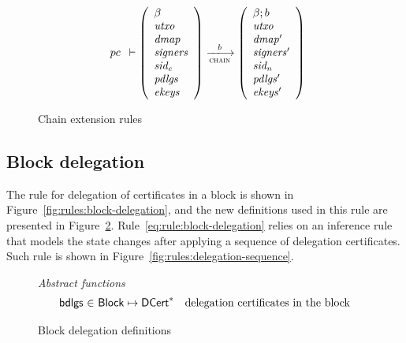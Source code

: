 \begin{figure}
\begin{equation}
{{\begin{array}{l}
         pc
      \end{array}}
      \vdash
      {
        \left(
          \begin{array}{l}
            \beta\\
            \var{utxo}\\
            \var{dmap}\\
            \var{signers}\\
            \var{sid_c}\\
            \var{pdlgs}\\
            \var{ekeys}
          \end{array}
        \right)
      }
      \trans{chain}{b}
      {
        \left(
          \begin{array}{l}
            \beta; b\\
            \var{utxo}\\
            \var{dmap'}\\
            \var{signers'}\\
            \var{sid_n}\\
            \var{pdlgs'}\\
            \var{ekeys'}
          \end{array}
        \right)
      }
    }
  \end{equation}
  \caption{Chain extension rules}
  \label{fig:rules:chain-extension}
\end{figure}

\subsection{Block delegation}
\label{sec:block-delegation}

The rule for delegation of certificates in a block is shown in
Figure~\ref{fig:rules:block-delegation}, and the new definitions used in this
rule are presented in Figure~\ref{fig:defs:block-delegation}.
Rule~\ref{eq:rule:block-delegation} relies on an inference rule that models the
state changes after applying a sequence of delegation certificates. Such rule
is shown in Figure~\ref{fig:rules:delegation-sequence}.

\begin{figure}
  \emph{Abstract functions}
  \begin{equation*}
    \begin{array}{r@{~\in~}lr}
      \fun{bdlgs} & \Block \mapsto \seqof{\DCert} & \text{delegation certificates in the block}\\
    \end{array}
  \end{equation*}
  \caption{Block delegation definitions}
  \label{fig:defs:block-delegation}
\end{figure}

